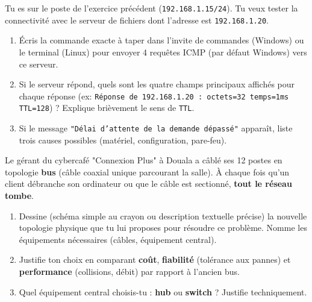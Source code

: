 \documentclass[11pt]{article}
\begin{document}
\begin{exercice}
Tu es sur le poste de l'exercice précédent (\texttt{192.168.1.15/24}). Tu veux tester la connectivité avec le serveur de fichiers dont l'adresse est \texttt{192.168.1.20}.
\begin{enumerate}
    \item Écris la commande exacte à taper dans l'invite de commandes (Windows) ou le terminal (Linux) pour envoyer 4 requêtes ICMP (par défaut Windows) vers ce serveur.
    \item Si le serveur répond, quels sont les quatre champs principaux affichés pour chaque réponse (ex: \texttt{Réponse de 192.168.1.20 : octets=32 temps=1ms TTL=128}) ? Explique brièvement le sens de \texttt{TTL}.
    \item Si le message \texttt{"Délai d'attente de la demande dépassé"} apparaît, liste trois causes possibles (matériel, configuration, pare-feu).
\end{enumerate}
\end{exercice}

\begin{exercice}
Le gérant du cybercafé "Connexion Plus" à Douala a câblé ses 12 postes en topologie \textbf{bus} (câble coaxial unique parcourant la salle). À chaque fois qu'un client débranche son ordinateur ou que le câble est sectionné, \textbf{tout le réseau tombe}.
\begin{enumerate}
    \item Dessine (schéma simple au crayon ou description textuelle précise) la nouvelle topologie physique que tu lui proposes pour résoudre ce problème. Nomme les équipements nécessaires (câbles, équipement central).
    \item Justifie ton choix en comparant \textbf{coût}, \textbf{fiabilité} (tolérance aux pannes) et \textbf{performance} (collisions, débit) par rapport à l'ancien bus.
    \item Quel équipement central choisis-tu : \textbf{hub} ou \textbf{switch} ? Justifie techniquement.
\end{enumerate}
\end{exercice}
\end{document}
